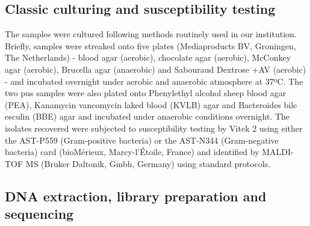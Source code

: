 \subsection{Classic culturing and susceptibility testing} \label{ssec:sample_culturing}

The samples were cultured following methods routinely used in our institution. 
Briefly, samples were streaked onto five plates (Mediaproducts BV, Groningen, The Netherlands) - blood agar (aerobic), chocolate agar (aerobic), McConkey agar (aerobic), Brucella agar (anaerobic) and Sabouraud Dextrose +AV (aerobic) - and incubated overnight under aerobic and anaerobic atmosphere at 37ºC. 
The two pus samples were also plated onto Phenylethyl alcohol sheep blood agar (PEA), Kanamycin vancomycin laked blood (KVLB) agar and Bacteroides bile esculin (BBE) agar and incubated under anaerobic conditions overnight. 
The isolates recovered were subjected to susceptibility testing by Vitek 2 using either the AST-P559 (Gram-positive bacteria) or the AST-N344 (Gram-negative bacteria) card (bioMérieux, Marcy-l'Étoile, France) and identified by MALDI-TOF MS (Bruker Daltonik, Gmbh, Germany) using standard protocols. 

\begin{landscape}

\end{landscape}

\subsection{DNA extraction, library preparation and sequencing} \label{ssec:sample_sequencing}

